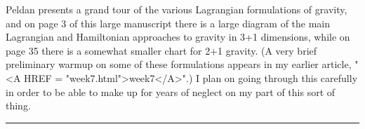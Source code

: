 Peldan presents a grand tour of the various Lagrangian formulations of
gravity, and on page 3 of this large manuscript there is a large diagram
of the main Lagrangian and Hamiltonian approaches to gravity in 3+1
dimensions, while on page 35 there is a somewhat smaller chart for 2+1
gravity.  (A very brief preliminary warmup on some of these formulations
appears in my earlier article, "<A HREF = "week7.html">week7</A>".)  I plan on going through this
carefully in order to be able to make up for years of neglect on my part
of this sort of thing.
\par\noindent\rule{\textwidth}{0.4pt}


